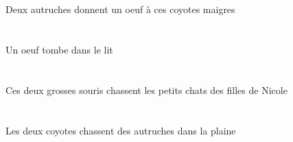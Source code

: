 \begin{exe}
\INDDuErgP{}   \autrucheBDuErgP{}    \DEMPlDatP{}   \maigreCPlP{}   \coyoteCPlDatP{}   \INDSgAbsP{}   \oeufCSgAbsP{}  \donnerVdPrsCSgP{}\\
\INDDuErgG{}   \autrucheBDuErgG{}    \DEMPlDatG{}   \maigreCPlG{}   \coyoteCPlDatG{}   \INDSgAbsG{}   \oeufCSgAbsG{}  \donnerVdPrsCSgG{}\\
Deux autruches donnent un oeuf à ces coyotes maigres
\ex\glll
\INDSgAbs{}   \oeufCSgAbs{}    \DEFSgObl{}   \litDSgObl{}   \DANS{}  \tomberViPrsCSg{}\\
\INDSgAbsP{}   \oeufCSgAbsP{}    \DEFSgOblP{}   \litDSgOblP{}   \DANSP{}  \tomberViPrsCSgP{}\\
\INDSgAbsG{}   \oeufCSgAbsG{}    \DEFSgOblG{}   \litDSgOblG{}   \DANSG{}  \tomberViPrsCSgG{}\\
Un oeuf tombe dans le lit
\ex\glll
\DEMDuErg{}   \grosBDu{}   \sourisBDuErg{}   \DEFPlAbs{}    \DEFPlObl{}    \INDSgObl{}   \NicoleBSgObl{}   \DE{}   \filleCPlObl{}   \DE{}   \petitDPl{}   \chatDPlAbs{}  \chasserVtPrsDPl{}\\
\DEMDuErgP{}   \grosBDuP{}   \sourisBDuErgP{}   \DEFPlAbsP{}    \DEFPlOblP{}    \INDSgOblP{}   \NicoleBSgOblP{}   \DEP{}   \filleCPlOblP{}   \DEP{}   \petitDPlP{}   \chatDPlAbsP{}  \chasserVtPrsDPlP{}\\
\DEMDuErgG{}   \grosBDuG{}   \sourisBDuErgG{}   \DEFPlAbsG{}    \DEFPlOblG{}    \INDSgOblG{}   \NicoleBSgOblG{}   \DEG{}   \filleCPlOblG{}   \DEG{}   \petitDPlG{}   \chatDPlAbsG{}  \chasserVtPrsDPlG{}\\
Ces deux grosses souris chassent les petits chats des filles de Nicole
\ex\glll
\DEFSgObl{}   \plaineASgObl{}   \DANS{}   \DEFDuErg{}   \coyoteCDuErg{}   \INDPlAbs{}   \autrucheBPlAbs{}  \chasserVtPrsBPl{}\\
\DEFSgOblP{}   \plaineASgOblP{}   \DANSP{}   \DEFDuErgP{}   \coyoteCDuErgP{}   \INDPlAbsP{}   \autrucheBPlAbsP{}  \chasserVtPrsBPlP{}\\
\DEFSgOblG{}   \plaineASgOblG{}   \DANSG{}   \DEFDuErgG{}   \coyoteCDuErgG{}   \INDPlAbsG{}   \autrucheBPlAbsG{}  \chasserVtPrsBPlG{}\\
Les deux coyotes chassent des autruches dans la plaine
\ex\glll
\DEFPlAbs{}   \noirBPl{}   \theBPlAbs{}    \DEFPlObl{}   \coussinBPlObl{}   \SOUS{}  \tomberViPrsBPl{}\\
\DEFPlAbsP{}   \noirBPlP{}   \theBPlAbsP{}    \DEFPlOblP{}   \coussinBPlOblP{}   \SOUSP{}  \tomberViPrsBPlP{}\\
\DEFPlAbsG{}   \noirBPlG{}   \theBPlAbsG{}    \DEFPlOblG{}   \coussinBPlOblG{}   \SOUSG{}  \tomberViPrsBPlG{}\\

\end{exe}
